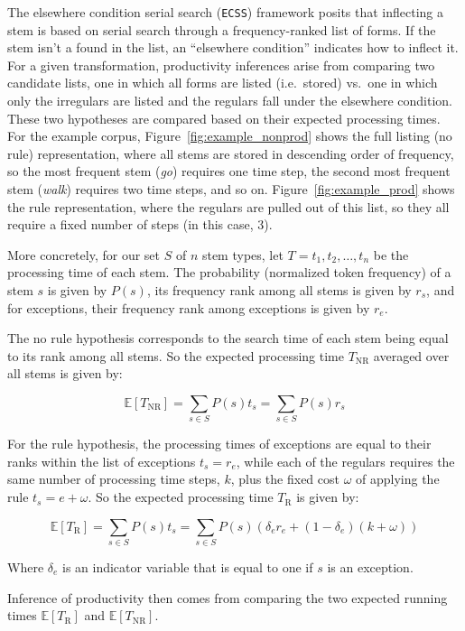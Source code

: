 \documentclass[
   11pt,
       ]{book}
\begin{document}
The elsewhere condition serial search (\texttt{ECSS}) framework posits that inflecting
a stem is based on serial search through a frequency-ranked list of forms. If
the stem isn't a found in the list, an ``elsewhere condition'' indicates how to
inflect it. For a given transformation, productivity inferences arise from
comparing two candidate lists, one in which all forms are listed (i.e.~stored)
vs.~one in which only the irregulars are listed and the regulars fall under the
elsewhere condition. These two hypotheses are compared based on their expected
processing times. For the example corpus, Figure~\ref{fig:example_nonprod} shows
the full listing (no rule) representation, where all stems are stored in
descending order of frequency, so the most frequent stem (\emph{go}) requires one
time step, the second most frequent stem (\emph{walk}) requires two time steps, and
so on. Figure~\ref{fig:example_prod} shows the rule representation, where the
regulars are pulled out of this list, so they all require a fixed number of
steps (in this case, 3).

More concretely, for our set \(S\) of \(n\) stem types, let
\(T = t_1, t_2, \ldots, t_n\) be the processing time of each stem. The probability
(normalized token frequency) of a stem \(s\) is given by \(P(s)\), its frequency
rank among all stems is given by \(r_s\), and for exceptions, their frequency rank
among exceptions is given by \(r_e\).

The no rule hypothesis corresponds to the search time of each stem being equal
to its rank among all stems. So the expected processing time \(T_\text{NR}\)
averaged over all stems is given by:

\[ \mathbb{E}[T_\text{NR}] = \sum_{s \in S} P(s)t_s = \sum_{s \in S} P(s)r_s \]

For the rule hypothesis, the processing times of exceptions are equal to their
ranks within the list of exceptions \(t_s = r_e\), while each of the regulars
requires the same number of processing time steps, \(k\), plus the fixed cost
\(\omega\) of applying the rule \(t_s = e + \omega\). So the expected processing
time \(T_\text{R}\) is given by:

\[ \mathbb{E}[T_\text{R}] = \sum_{s \in S} P(s)t_s = \sum_{s \in S} P(s) (\delta_e r_e + (1 - \delta_e)(k + \omega)) \]

Where \(\delta_e\) is an indicator variable that is equal to one if \(s\) is an
exception.

Inference of productivity then comes from comparing the two expected running
times \(\mathbb{E}[T_\text{R}]\) and \(\mathbb{E}[T_\text{NR}]\).
\end{document}
